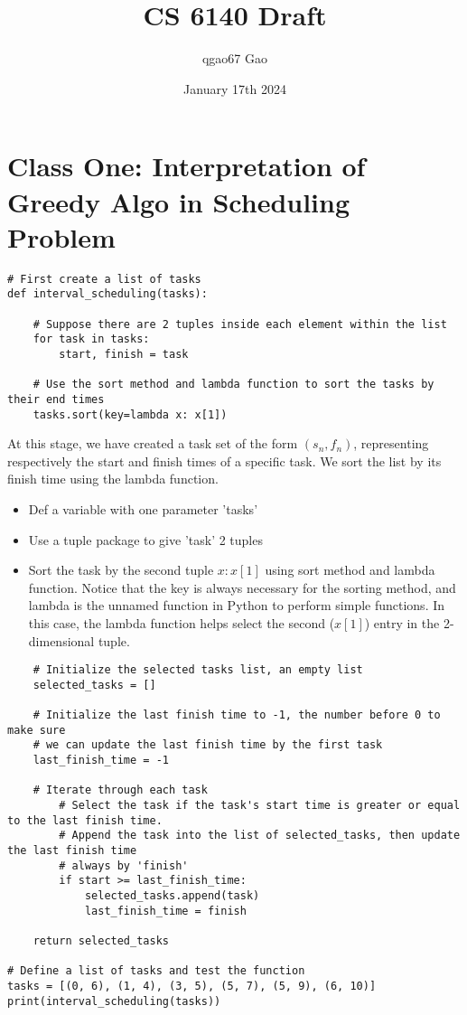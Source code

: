 \documentclass{article}
\title{CS 6140 Draft}
\author{qgao67 Gao}
\date{January 17th 2024}
\begin{document}
\maketitle

\section{Class One: Interpretation of Greedy Algo in Scheduling Problem}
\begin{verbatim}
# First create a list of tasks
def interval_scheduling(tasks):

    # Suppose there are 2 tuples inside each element within the list
    for task in tasks:
        start, finish = task

    # Use the sort method and lambda function to sort the tasks by their end times
    tasks.sort(key=lambda x: x[1])
\end{verbatim}
At this stage, we have created a task set of the form $(s_n,f_n)$, representing respectively the start and finish times of a specific task. We sort the list by its finish time using the lambda function.\par
\begin{itemize}
    \item Def a variable with one parameter 'tasks'
    \item Use a tuple package to give 'task' 2 tuples
    \item Sort the task by the second tuple $x:x[1]$ using sort method and lambda function. Notice that the key is always necessary for the sorting method, and lambda is the unnamed function in Python to perform simple functions. In this case, the lambda function helps select the second ($x[1]$) entry in the 2-dimensional tuple.
\end{itemize}
\begin{verbatim}
    # Initialize the selected tasks list, an empty list
    selected_tasks = []

    # Initialize the last finish time to -1, the number before 0 to make sure
    # we can update the last finish time by the first task
    last_finish_time = -1

    # Iterate through each task
        # Select the task if the task's start time is greater or equal to the last finish time.
        # Append the task into the list of selected_tasks, then update the last finish time
        # always by 'finish'
        if start >= last_finish_time:
            selected_tasks.append(task)
            last_finish_time = finish

    return selected_tasks

# Define a list of tasks and test the function
tasks = [(0, 6), (1, 4), (3, 5), (5, 7), (5, 9), (6, 10)]
print(interval_scheduling(tasks))
\end{verbatim}
\end{document}
